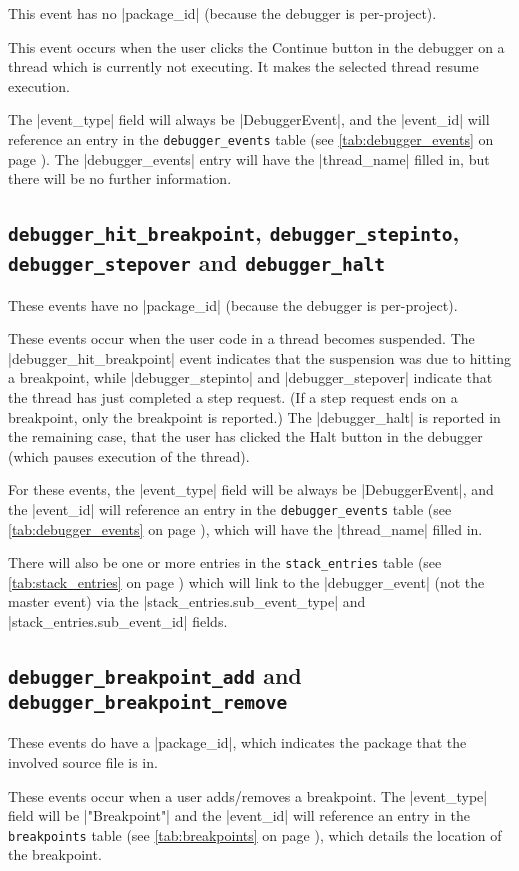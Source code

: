 \documentclass{book}
\newcommand{\myref}[1]{\autoref{#1} on page \pageref*{#1}}
\newcommand{\tabref}[1]{\lstinline|#1| table (see \myref{tab:#1})}
\begin{document}
This event has no |package_id| (because the debugger is per-project).

This event occurs when the user clicks the Continue button in the debugger on
a thread which is currently not executing.
It makes the selected thread resume execution.  

The |event_type| field will always be |DebuggerEvent|, and the |event_id| will
reference an entry in the \tabref{debugger_events}.  The |debugger_events|
entry will have the |thread_name| filled in, but there will be no further information.

\subsection{\lstinline|debugger_hit_breakpoint|, \lstinline|debugger_stepinto|, \lstinline|debugger_stepover| and \lstinline|debugger_halt|}

These events have no |package_id| (because the debugger is per-project).

These events occur when the user code in a thread becomes suspended.  The
|debugger_hit_breakpoint| event indicates that the suspension was due to
hitting a breakpoint, while |debugger_stepinto| and |debugger_stepover|
indicate that the thread has just completed a step request.  (If a step
request ends on a breakpoint, only the breakpoint is reported.)  The
|debugger_halt| is reported in the remaining case, that the user has
clicked the Halt button in the debugger (which pauses execution of the thread).

For these events, the |event_type| field will be always be |DebuggerEvent|,
and the |event_id| will reference an entry in the \tabref{debugger_events},
which will have the |thread_name| filled in.

There will also be one or more entries in the \tabref{stack_entries} which
will link to the |debugger_event| (not the master event) via the
|stack_entries.sub_event_type| and |stack_entries.sub_event_id| fields.

\subsection{\lstinline|debugger_breakpoint_add| and \lstinline|debugger_breakpoint_remove|}

These events do have a |package_id|, which indicates the package that the
involved source file is in.

These events occur when a user adds/removes a breakpoint.  The |event_type|
field will be |"Breakpoint"| and the |event_id| will reference an entry in
the \tabref{breakpoints}, which details the location of the breakpoint.
\end{document}
